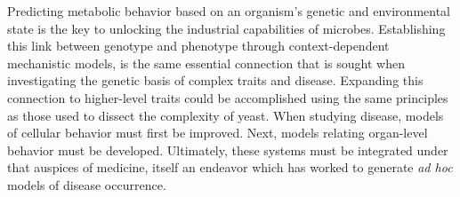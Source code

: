 Predicting metabolic behavior based on an organism's genetic and environmental state is the key to unlocking the industrial capabilities of microbes. Establishing this link between genotype and phenotype through context-dependent mechanistic models, is the same essential connection that is sought when investigating the genetic basis of complex traits and disease. Expanding this connection to higher-level traits could be accomplished using the same principles as those used to dissect the complexity of yeast. When studying disease, models of cellular behavior must first be improved. Next, models relating organ-level behavior must be developed. Ultimately, these systems must be integrated under that auspices of medicine, itself an endeavor which has worked to generate \textit{ad hoc} models of disease occurrence. 
